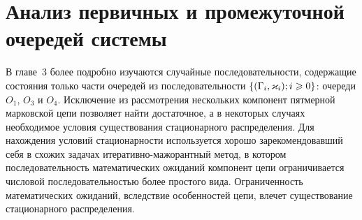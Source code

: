 \chapter{Анализ первичных и промежуточной очередей системы}	

В главе~3 более подробно изучаются случайные последовательности,  содержащие состояния только части очередей из последовательности $\Mark$: очереди $O_1$,  $O_3$ и $O_4$. Исключение из рассмотрения нескольких компонент пятмерной марковской цепи позволяет найти достаточное,  а в некоторых случаях  необходимое условия существования стационарного распределения. Для нахождения условий стационарности используется хорошо зарекомендовавший себя в схожих задачах итеративно-мажорантный метод,  в котором последовательность математических ожиданий компонент цепи ограничивается числовой последовательностью более простого вида.
Ограниченность математических ожиданий,  вследствие особенностей цепи,  влечет существование стационарного распределения.

